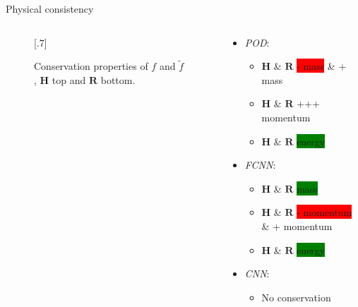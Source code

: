 \documentclass[usenames,dvipsnames,Nike,mathserif]{tuberlinbeamer}
\begin{document}
\begin{frame}[fragile]{Physical consistency}
		\begin{columns}
			\begin{column}{.61\textwidth}
				\begin{figure}
					\scalebox{.7}[.7]{}
					\caption{
						Conservation properties of $f$ and $\tilde{f}$, $\mathbf{H}$ top and $\mathbf{R}$ bottom.}
				\end{figure}
			\end{column}
		\begin{column}{.39\textwidth}
			\begin{itemize}
				\item\emph{POD}:
				\begin{itemize}
					\item $\mathbf{H}$ \& $\mathbf{R}$ \colorbox{red}{- mass} 
					\& \colorbox{ProcessBlue}{+ mass}
					\item $\mathbf{H}$ \& $\mathbf{R}$ \colorbox{ProcessBlue}{+++ momentum}
					\item $\mathbf{H}$ \& $\mathbf{R}$ \colorbox{green}{energy} 
				\end{itemize}
				\item\emph{FCNN}:
				\begin{itemize}
					\item $\mathbf{H}$ \& $\mathbf{R}$ \colorbox{green}{mass} 
					\item $\mathbf{H}$ \& $\mathbf{R}$ \colorbox{red}{- momentum} 
					\& \colorbox{ProcessBlue}{+ momentum}
					\item $\mathbf{H}$ \& $\mathbf{R}$ \colorbox{green}{energy} 
				\end{itemize}
				\item\emph{CNN}:
				\begin{itemize}
					\item No conservation
				\end{itemize}
			\end{itemize}
		\end{column}
	\end{columns}
\end{frame}
\end{document}

